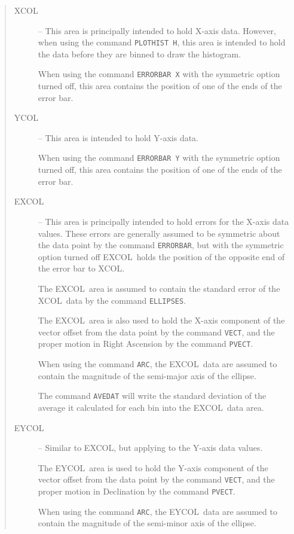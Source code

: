 \documentclass[twoside,11pt]{article}
\newcommand{\htmlref}[2]{#1}
\renewcommand{\_}{\texttt{\symbol{95}}}
\newcommand{\xcol}{{\sf XCOL}}
\newcommand{\excol}{{\sf EXCOL}}
\newcommand{\ycol}{{\sf YCOL}}
\newcommand{\eycol}{{\sf EYCOL}}
\newcommand{\cnam}[1]{{\tt #1}}
\newcommand{\iref} [1]{\htmlref{#1}{#1}}
\begin{document}
\begin{quote}
\begin{description}
\item [\xcol] -- This area is principally intended to hold X-axis
data.  However, when using the command \cnam{\iref{PLOTHIST} H}, this
area is intended to hold the data before they are binned to draw the
histogram.

When using the command \cnam{\iref{ERRORBAR} X} with the symmetric
option turned off, this area contains the position of one of the ends
of the error bar.

\item [\ycol] -- This area is intended to hold Y-axis data.

When using the command \cnam{\iref{ERRORBAR} Y} with the symmetric
option turned off, this area contains the position of one of the ends
of the error bar.

\item [\excol] -- This area is principally intended to hold errors for the
X-axis data values.
These errors are generally assumed to be symmetric about the data point
by the command \cnam{\iref{ERRORBAR}}, but with the symmetric option turned off
\excol\ holds the position of the opposite end of the error bar to
\xcol.

The \excol\ area is assumed to contain the standard error of the \xcol\ data by
the command \cnam{\iref{ELLIPSES}}.

The \excol\ area is also used to hold the X-axis component of the
vector offset from the data point by the command \cnam{\iref{VECT}},
and the proper motion in Right Ascension by the command
\cnam{\iref{PVECT}}.

When using the command \cnam{\iref{ARC}}, the \excol\ data are assumed
to contain the magnitude of the semi-major axis of the ellipse.

The command \cnam{\iref{AVEDAT}} will write the standard deviation of
the average it calculated for each bin into the \excol\ data area.

\item [\eycol] -- Similar to \excol, but applying to the Y-axis data values.

The \eycol\ area is used to hold the Y-axis component of the vector
offset from the data point by the command \cnam{\iref{VECT}}, and the
proper motion in Declination by the command \cnam{\iref{PVECT}}.

When using the command \cnam{\iref{ARC}}, the \eycol\ data are assumed
to contain the magnitude of the semi-minor axis of the ellipse.


\end{description}
\end{quote}
\end{document}
